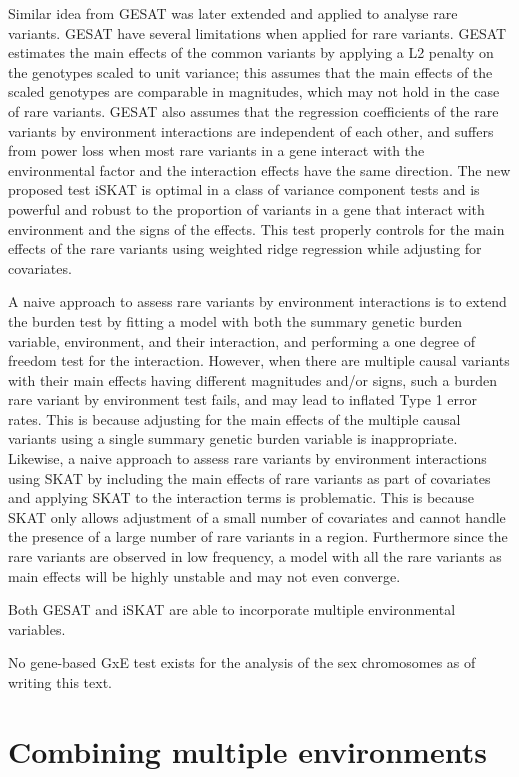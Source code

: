 \documentclass[]{book}
\theoremstyle{definition}
\theoremstyle{definition}
\theoremstyle{definition}
\theoremstyle{remark}
\begin{document}
Similar idea from GESAT was later extended and applied to analyse rare
variants. GESAT have several limitations when applied for rare variants.
GESAT estimates the main effects of the common variants by applying a L2
penalty on the genotypes scaled to unit variance; this assumes that the
main effects of the scaled genotypes are comparable in magnitudes, which
may not hold in the case of rare variants. GESAT also assumes that the
regression coefficients of the rare variants by environment interactions
are independent of each other, and suffers from power loss when most
rare variants in a gene interact with the environmental factor and the
interaction effects have the same direction. The new proposed test iSKAT
is optimal in a class of variance component tests and is powerful and
robust to the proportion of variants in a gene that interact with
environment and the signs of the effects. This test properly controls
for the main effects of the rare variants using weighted ridge
regression while adjusting for covariates.

A naive approach to assess rare variants by environment interactions is
to extend the burden test by fitting a model with both the summary
genetic burden variable, environment, and their interaction, and
performing a one degree of freedom test for the interaction. However,
when there are multiple causal variants with their main effects having
different magnitudes and/or signs, such a burden rare variant by
environment test fails, and may lead to inflated Type 1 error rates.
This is because adjusting for the main effects of the multiple causal
variants using a single summary genetic burden variable is
inappropriate. Likewise, a naive approach to assess rare variants by
environment interactions using SKAT by including the main effects of
rare variants as part of covariates and applying SKAT to the interaction
terms is problematic. This is because SKAT only allows adjustment of a
small number of covariates and cannot handle the presence of a large
number of rare variants in a region. Furthermore since the rare variants
are observed in low frequency, a model with all the rare variants as
main effects will be highly unstable and may not even converge.

Both GESAT and iSKAT are able to incorporate multiple environmental
variables.

No gene-based GxE test exists for the analysis of the sex chromosomes as
of writing this text.

\section{Combining multiple
environments}\label{combining-multiple-environments}
\end{document}
